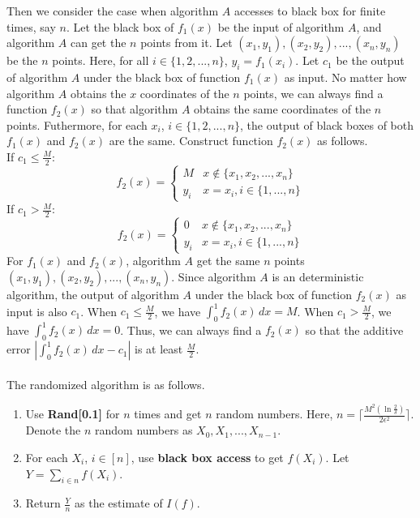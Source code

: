 Then we consider the case when algorithm $A$ accesses to black box for finite times, say $n$.
Let the black box of $f_1(x)$ be the input of algorithm $A$, and algorithm $A$ can get the $n$ points from it.
Let $(x_1,y_1),(x_2,y_2),...,(x_n,y_n)$ be the $n$ points. Here, for all $i\in\{1,2,...,n\}$, $y_i=f_1(x_i)$.
Let $c_1$ be the output of algorithm $A$ under the black box of function $f_1(x)$ as input.
No matter how algorithm $A$ obtains the $x$ coordinates of the $n$ points, 
we can always find a function $f_2(x)$ so that algorithm $A$ obtains the same coordinates of the $n$ points.
Futhermore, for each $x_i$, $i\in \{1,2,...,n\}$, the output of  black boxes of both $f_1(x)$ and $f_2(x)$ are the same.  
Construct function $f_2(x)$ as follows.\\
If $c_1 \le \frac{M}{2}$:
\begin{equation}
   \nonumber  f_2(x)=
    \begin{cases}
    M& x\notin\{x_1,x_2,...,x_n\}\\
    y_i& x=x_i, i\in\{1,...,n\}
    \end{cases}
\end{equation}
If $c_1 > \frac{M}{2}$:
\begin{equation}
   \nonumber  f_2(x)=
    \begin{cases}
    0& x\notin\{x_1,x_2,...,x_n\}\\
    y_i& x=x_i, i\in\{1,...,n\}
    \end{cases}
\end{equation}
For $f_1(x)$ and $f_2(x)$, algorithm $A$ get the same $n$ points $(x_1,y_1),(x_2,y_2),...,(x_n,y_n)$.
Since algorithm $A$ is an deterministic algorithm, 
the output of algorithm $A$ under the black box of function $f_2(x)$ as input is also $c_1$.
When $c_1 \le \frac{M}{2}$, we have $\int_{0}^{1} f_2(x) \,dx=M$.
When $c_1 > \frac{M}{2}$, we have $\int_{0}^{1} f_2(x) \,dx=0$.
Thus, we can always find a $f_2(x)$ so that the additive error $|\int_{0}^{1} f_2(x) \,dx - c_1|$ is at least $\frac{M}{2}$.
\\
\noindent {}\\
The randomized algorithm is as follows.
\begin{enumerate}
    \item Use \textbf{Rand[0.1]} for $n$ times and get $n$ random numbers.
    Here, $n=\lceil \frac{M^2(\ln \frac{2}{\delta})}{2\epsilon^2}\rceil $.
    Denote the $n$ random numbers as $X_0, X_1, ..., X_{n-1}$.
    \item For each $X_i$, $i\in [n]$, use \textbf{black box access} to get $f(X_i)$.
    Let $Y=\sum_{i\in n}f(X_i)$.
    \item Return $\frac{Y}{n}$ as the estimate of $I(f)$.
\end{enumerate}
